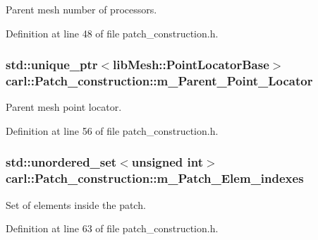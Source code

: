 Parent mesh number of processors. 



Definition at line 48 of file patch\+\_\+construction.\+h.

\hypertarget{classcarl_1_1_patch__construction_a382e1ea46006b1ea6445af758e157ceb}{}
\subsubsection[{m\+\_\+\+Parent\+\_\+\+Point\+\_\+\+Locator}]{\setlength{\rightskip}{0pt plus 5cm}std\+::unique\+\_\+ptr$<$lib\+Mesh\+::\+Point\+Locator\+Base$>$ carl\+::\+Patch\+\_\+construction\+::m\+\_\+\+Parent\+\_\+\+Point\+\_\+\+Locator\hspace{0.3cm}{\ttfamily [protected]}}\label{classcarl_1_1_patch__construction_a382e1ea46006b1ea6445af758e157ceb}


Parent mesh point locator. 



Definition at line 56 of file patch\+\_\+construction.\+h.

\hypertarget{classcarl_1_1_patch__construction_af7db498027d46bff8464757e824404fb}{}
\subsubsection[{m\+\_\+\+Patch\+\_\+\+Elem\+\_\+indexes}]{\setlength{\rightskip}{0pt plus 5cm}std\+::unordered\+\_\+set$<$unsigned int$>$ carl\+::\+Patch\+\_\+construction\+::m\+\_\+\+Patch\+\_\+\+Elem\+\_\+indexes\hspace{0.3cm}{\ttfamily [protected]}}\label{classcarl_1_1_patch__construction_af7db498027d46bff8464757e824404fb}


Set of elements inside the patch. 



Definition at line 63 of file patch\+\_\+construction.\+h.

